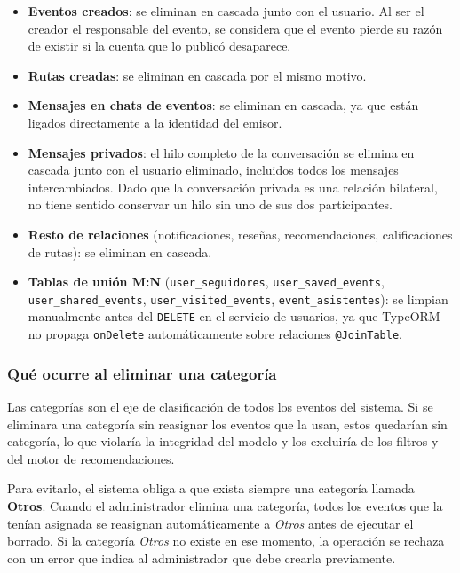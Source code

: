 \begin{itemize}
    \item \textbf{Eventos creados}: se eliminan en cascada junto con el usuario. Al ser el creador el responsable del evento, se considera que el evento pierde su razón de existir si la cuenta que lo publicó desaparece.
    \item \textbf{Rutas creadas}: se eliminan en cascada por el mismo motivo.
    \item \textbf{Mensajes en chats de eventos}: se eliminan en cascada, ya que están ligados directamente a la identidad del emisor.
    \item \textbf{Mensajes privados}: el hilo completo de la conversación se elimina en cascada junto con el usuario eliminado, incluidos todos los mensajes intercambiados. Dado que la conversación privada es una relación bilateral, no tiene sentido conservar un hilo sin uno de sus dos participantes.
    \item \textbf{Resto de relaciones} (notificaciones, reseñas, recomendaciones, calificaciones de rutas): se eliminan en cascada.
    \item \textbf{Tablas de unión M:N} (\texttt{user\_seguidores}, \texttt{user\_saved\_events}, \texttt{user\_shared\_events}, \texttt{user\_visited\_events}, \texttt{event\_asistentes}): se limpian manualmente antes del \texttt{DELETE} en el servicio de usuarios, ya que TypeORM no propaga \texttt{onDelete} automáticamente sobre relaciones \texttt{@JoinTable}.
\end{itemize}

\subsubsection{Qué ocurre al eliminar una categoría}

Las categorías son el eje de clasificación de todos los eventos del sistema. Si se eliminara una categoría sin reasignar los eventos que la usan, estos quedarían sin categoría, lo que violaría la integridad del modelo y los excluiría de los filtros y del motor de recomendaciones.

Para evitarlo, el sistema obliga a que exista siempre una categoría llamada \textbf{Otros}. Cuando el administrador elimina una categoría, todos los eventos que la tenían asignada se reasignan automáticamente a \emph{Otros} antes de ejecutar el borrado. Si la categoría \emph{Otros} no existe en ese momento, la operación se rechaza con un error que indica al administrador que debe crearla previamente.

